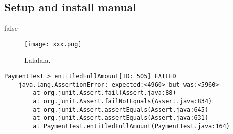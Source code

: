 \documentclass[12pt,a4paper]{report}
\begin{document}
\begin{appendix}
\chapter{Setup and install manual}

\end{appendix}

\if false

\begin{figure}[H]
    \centering
    \texttt{[image: xxx.png]}
    \caption{Lalalala.}
    \label{fig:my_label}
\end{figure}

\begin{verbatim}
PaymentTest > entitledFullAmount[ID: 505] FAILED
    java.lang.AssertionError: expected:<4960> but was:<5960>
        at org.junit.Assert.fail(Assert.java:88)
        at org.junit.Assert.failNotEquals(Assert.java:834)
        at org.junit.Assert.assertEquals(Assert.java:645)
        at org.junit.Assert.assertEquals(Assert.java:631)
        at PaymentTest.entitledFullAmount(PaymentTest.java:164)
\end{verbatim}
\end{document}
